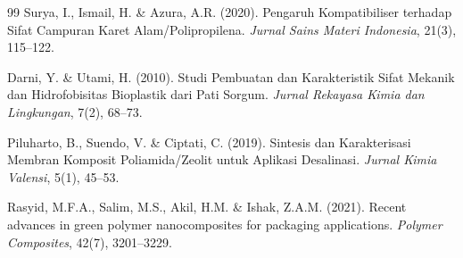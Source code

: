 \documentclass[12pt,a4paper,openany]{book}
\begin{document}
\begin{thebibliography}{99}
 Surya, I., Ismail, H. \& Azura, A.R. (2020). Pengaruh Kompatibiliser terhadap Sifat Campuran Karet Alam/Polipropilena. \textit{Jurnal Sains Materi Indonesia}, 21(3), 115--122.

 Darni, Y. \& Utami, H. (2010). Studi Pembuatan dan Karakteristik Sifat Mekanik dan Hidrofobisitas Bioplastik dari Pati Sorgum. \textit{Jurnal Rekayasa Kimia dan Lingkungan}, 7(2), 68--73.

 Piluharto, B., Suendo, V. \& Ciptati, C. (2019). Sintesis dan Karakterisasi Membran Komposit Poliamida/Zeolit untuk Aplikasi Desalinasi. \textit{Jurnal Kimia Valensi}, 5(1), 45--53.

 Rasyid, M.F.A., Salim, M.S., Akil, H.M. \& Ishak, Z.A.M. (2021). Recent advances in green polymer nanocomposites for packaging applications. \textit{Polymer Composites}, 42(7), 3201--3229.

\end{thebibliography}
\end{document}
